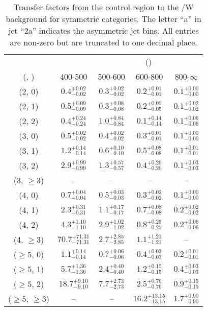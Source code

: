 \begin{table}[h!]
\tiny
\centering
\caption{Transfer factors from the \gj control region to the \ttbar/W background for symmetric categories. The letter ``a'' in jet \eg ``2a''  indicates the asymmetric jet bins. All entries are non-zero but are truncated to one decimal place.\label{tab:tf_ttw_gj_sym}}
\begin{tabular}
{ccccc}
	\hline\hline
&	& \multicolumn{4}{c}{\scalht (\gev)} \\ 
	 (\njet,  \nb) & 400-500 & 500-600 & 600-800 & 800-$\infty$ \\ [0.8ex] 
\hline
	(2, 0) & $0.4^{+ 0.02 }_{- 0.02 }$ & $0.3^{+ 0.02 }_{- 0.02 }$ & $0.2^{+ 0.01 }_{- 0.01 }$ & $0.1^{+ 0.00 }_{- 0.00 }$ \\[0.5ex] 
	(2, 1) & $0.5^{+ 0.09 }_{- 0.09 }$ & $0.3^{+ 0.08 }_{- 0.08 }$ & $0.2^{+ 0.05 }_{- 0.05 }$ & $0.1^{+ 0.02 }_{- 0.02 }$ \\[0.5ex] 
	(2, 2) & $0.4^{+ 0.24 }_{- 0.24 }$ & $1.0^{+ 0.84 }_{- 0.84 }$ & $0.1^{+ 0.14 }_{- 0.14 }$ & $0.1^{+ 0.06 }_{- 0.06 }$ \\[0.5ex] 
	(3, 0) & $0.5^{+ 0.02 }_{- 0.02 }$ & $0.4^{+ 0.02 }_{- 0.02 }$ & $0.3^{+ 0.01 }_{- 0.01 }$ & $0.1^{+ 0.00 }_{- 0.00 }$ \\[0.5ex] 
	(3, 1) & $1.2^{+ 0.14 }_{- 0.14 }$ & $0.6^{+ 0.10 }_{- 0.10 }$ & $0.5^{+ 0.08 }_{- 0.08 }$ & $0.1^{+ 0.01 }_{- 0.01 }$ \\[0.5ex] 
	(3, 2) & $2.9^{+ 0.99 }_{- 0.99 }$ & $1.3^{+ 0.57 }_{- 0.57 }$ & $0.4^{+ 0.20 }_{- 0.20 }$ & $0.1^{+ 0.03 }_{- 0.03 }$ \\[0.5ex] 
	(3, $\ge3$) & -- & -- & -- & -- \\[0.5ex] 
	(4, 0) & $0.7^{+ 0.04 }_{- 0.04 }$ & $0.5^{+ 0.03 }_{- 0.03 }$ & $0.3^{+ 0.02 }_{- 0.02 }$ & $0.1^{+ 0.00 }_{- 0.00 }$ \\[0.5ex] 
	(4, 1) & $2.3^{+ 0.31 }_{- 0.31 }$ & $1.1^{+ 0.17 }_{- 0.17 }$ & $0.7^{+ 0.08 }_{- 0.08 }$ & $0.2^{+ 0.02 }_{- 0.02 }$ \\[0.5ex] 
	(4, 2) & $4.3^{+ 1.10 }_{- 1.10 }$ & $2.9^{+ 1.02 }_{- 1.02 }$ & $0.8^{+ 0.25 }_{- 0.25 }$ & $0.2^{+ 0.06 }_{- 0.06 }$ \\[0.5ex] 
	(4, $\ge3$) & $70.7^{+ 71.31 }_{- 71.31 }$ & $2.7^{+ 2.85 }_{- 2.85 }$ & $1.1^{+ 1.21 }_{- 1.21 }$ & -- \\[0.5ex] 
	($\ge5$, 0) & $1.1^{+ 0.14 }_{- 0.14 }$ & $0.7^{+ 0.06 }_{- 0.06 }$ & $0.4^{+ 0.03 }_{- 0.03 }$ & $0.2^{+ 0.01 }_{- 0.01 }$ \\[0.5ex] 
	($\ge5$, 1) & $5.7^{+ 1.36 }_{- 1.36 }$ & $2.4^{+ 0.40 }_{- 0.40 }$ & $1.2^{+ 0.15 }_{- 0.15 }$ & $0.4^{+ 0.03 }_{- 0.03 }$ \\[0.5ex] 
	($\ge5$, 2) & $18.7^{+ 9.10 }_{- 9.10 }$ & $7.7^{+ 2.73 }_{- 2.73 }$ & $2.5^{+ 0.76 }_{- 0.76 }$ & $0.9^{+ 0.15 }_{- 0.15 }$ \\[0.5ex] 
	($\ge5$, $\ge3$) & -- & -- & $16.2^{+ 13.15 }_{- 13.15 }$ & $1.7^{+ 0.90 }_{- 0.90 }$ \\[0.5ex] 
	\hline
	\hline
\end{tabular}
\end{table}
